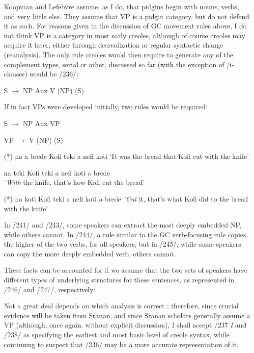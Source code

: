 Koopman and Lefebvre assume, as I do, that pidgins begin with
nouns, verbs, and very little else. They assume that VP is a pidgin category, but do not defend it as such. For reasons given in the discussion of GC movement rules above, I do not think VP is a category in most early creoles, although of course creoles may acquire it later, either through decreolization or regular syntactic change (reanalysis). The only rule creoles would then require to generate any of the comple\-ment types, serial or other, discussed so far (with the exception of
/i-clauses) would be /236/:

\ea\label{ex:2:236}
 S {$\to$} NP Aux V (NP) (S)
\z

If in fact VPs were developed initially, two rules would be required:

\ea\label{ex:2:237}
S {$\to$} NP Aux VP
\z

\ea\label{ex:2:238}
 VP {$\to$} V (NP) (S)
\z


\ea\label{ex:2:243}
 (*) na a brede Kofi teki a nefi koti
\glt `It was the bread that Kofi cut with the knife'
\z


\ea\label{ex:2:244}
na teki Kofi teki a nefi koti a brede\\
\glt \textit{'With} the knife, that's how Kofi cut the bread'
\z

\ea\label{ex:2:245}
 (*) na koti Kofi teki a nefi koti a brede
\glt \textit{'Cut} it, that's what Kofi did to the bread with the knife'
\z



In /241/ and /243/, some speakers can extract the most deeply embed\-ded NP, while others cannot. In /244/, a rule similar to the GC verb-focusing rule copies the higher of the two verbs, for all speakers; but in /245/, while some speakers can copy the more deeply embedded verb, others cannot.

These facts can be accounted for if we assume that the two sets of speakers have different types of underlying structures for these sentences, as represented in /246/ and /247/, respectively:

Not a great deal depends on which analysis is correct ; therefore, since crucial evidence will be taken from Sranan, and since Sranan scholars generally assume a VP (although, once again, without explicit discussion), I shall accept /237 \textit{I} and /238/ as specifying the earliest and most basic level of creole syntax, while continuing to suspect that
/236/ may be a more accurate representation of it.


